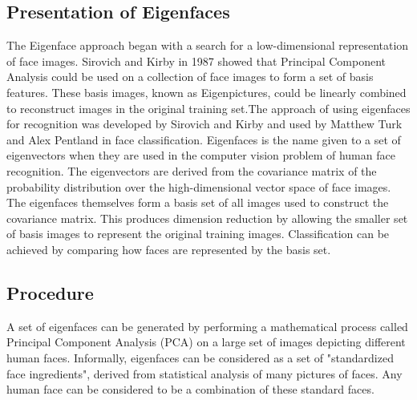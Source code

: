 \subsection{Presentation of Eigenfaces}


	
The Eigenface approach began with a search for a low-dimensional representation of face images. Sirovich and Kirby in 1987 showed that Principal Component Analysis could be used on a collection of face images to form a set of basis features. These basis images, known as Eigenpictures, could be linearly combined to reconstruct images in the original training set.The approach of using eigenfaces for recognition was developed by Sirovich and Kirby and used by Matthew Turk and Alex Pentland in face classification.
Eigenfaces is the name given to a set of eigenvectors when they are used in the computer vision problem of human face recognition. The eigenvectors are derived from the covariance matrix of the probability distribution over the high-dimensional vector space of face images. The eigenfaces themselves form a basis set of all images used to construct the covariance matrix. This produces dimension reduction by allowing the smaller set of basis images to represent the original training images. Classification can be achieved by comparing how faces are represented by the basis set.

\subsection{Procedure}

A set of eigenfaces can be generated by performing a mathematical process called Principal Component Analysis (PCA) on a large set of images depicting different human faces. Informally, eigenfaces can be considered as a set of "standardized face ingredients", derived from statistical analysis of many pictures of faces. Any human face can be considered to be a combination of these standard faces.
